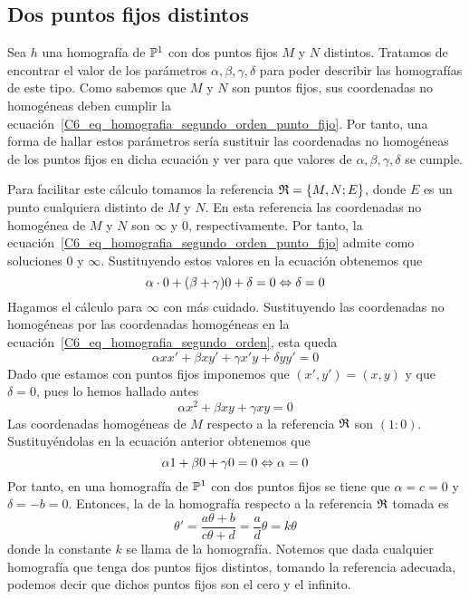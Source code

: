 \subsection{Dos puntos fijos distintos}
Sea $h$ una homografía de $\mathbb{P}^1$ con dos puntos fijos $M$ y $N$ distintos. Tratamos de encontrar el valor de los parámetros $\alpha, \beta,\gamma,\delta$ para poder describir las homografías de este tipo. Como sabemos que $M$ y $N$ son puntos fijos, sus coordenadas no homogéneas deben cumplir la ecuación~\eqref{C6_eq_homografia_segundo_orden_punto_fijo}. Por tanto, una forma de hallar estos parámetros sería sustituir las coordenadas no homogéneas de los puntos fijos en dicha ecuación y ver para que valores de $\alpha, \beta,\gamma,\delta$ se cumple. 

Para facilitar este cálculo tomamos la referencia $\mathfrak{R}=\{M,N;E\}$, donde $E$ es un punto cualquiera distinto de $M$ y $N$. En esta referencia las coordenadas no homogénea de $M$ y $N$ son $\infty$ y $0$, respectivamente. Por tanto, la ecuación~\eqref{C6_eq_homografia_segundo_orden_punto_fijo} admite como soluciones $0$ y $\infty$. Sustituyendo estos valores en la ecuación obtenemos que 
\begin{equation*}
	\alpha\cdot 0+(\beta+\gamma)0+\delta=0\Leftrightarrow\delta=0
\end{equation*}
Hagamos el cálculo para $\infty$ con más cuidado. Sustituyendo las coordenadas no homogéneas por las coordenadas homogéneas en la ecuación~\eqref{C6_eq_homografia_segundo_orden}, esta queda
\begin{equation}
	\alpha xx'+\beta xy'+\gamma x'y+\delta yy'=0
\end{equation}
Dado que estamos con puntos fijos imponemos que $(x',y')=(x,y)$ y que $\delta=0$, pues lo hemos hallado antes
\begin{equation*}
	\alpha x^2+\beta xy+\gamma xy=0
\end{equation*}
Las coordenadas homogéneas de $M$ respecto a la referencia $\mathfrak{R}$ son $(1:0)$. Sustituyéndolas en la ecuación anterior obtenemos que
\begin{equation*}
\alpha 1+\beta 0+\gamma 0=0\Leftrightarrow \alpha=0
\end{equation*}
Por tanto, en una homografía de $\mathbb{P}^1$ con dos puntos fijos se tiene que $\alpha=c=0$ y $\delta=-b=0$. Entonces, la  de la homografía respecto a la referencia $\mathfrak{R}$ tomada es
\begin{equation}
	\theta'=\frac{a\theta+b}{c\theta +d}=\frac{a}{d}\theta=k\theta
\end{equation}
donde la constante $k$ se llama  de la homografía. Notemos que dada cualquier homografía que tenga dos puntos fijos distintos, tomando la referencia adecuada, podemos decir que dichos puntos fijos son el cero y el infinito.

